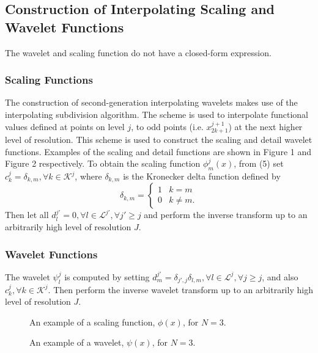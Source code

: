 \documentclass[11pt]{article}
\begin{document}
\subsection{Construction of Interpolating Scaling and Wavelet Functions}
The wavelet and scaling function do not have a closed-form expression.
\subsubsection{Scaling Functions}
The construction of second-generation interpolating wavelets makes use of the interpolating subdivision algorithm. 
The scheme is used to interpolate functional values defined at points on level $j$, to odd points (i.e. $x_{2k+1}^{j+1}$) 
at the next higher level of resolution. This scheme is used to construct the scaling and detail wavelet functions. 
Examples of the scaling and detail functions are shown in Figure 1 and Figure 2 respectively.
To obtain the scaling function $\phi_{m}^{j}(x)$, from (5) set $c_{k}^{j}=\delta_{k,m}, \forall k \in \mathcal{K}^j$, where $\delta_{k,m}$ is the Kronecker delta function defined by
\[ \delta_{k,m} = \begin{cases} 
      1 & k=m \\
      0 & k \neq m.
   \end{cases}
\]
Then let all $d_{l}^{j'}=0, \forall l \in \mathcal{L}^{j'}, \forall j' \geq j$ and perform the inverse transform up to an arbitrarily high level of resolution $J$. 

\subsubsection{Wavelet Functions}
The wavelet $\psi_{l}^{j}$ is computed by setting $d_{m}^{j'} = \delta_{j',j} \delta_{l,m}, \forall l \in \mathcal{L}^{j}, \forall j \geq j$, and also $c_{k}^{j}, \forall k \in \mathcal{K}^j$. Then perform the inverse wavelet transform up to an arbitrarily high level of resolution $J$.

\begin{figure}
	\center
	
	\caption{An example of a scaling function, $\phi(x)$, for $N=3$.}
\end{figure}
\begin{figure}
	\center
	
	\caption{An example of a wavelet, $\psi(x)$, for $N=3$.}
\end{figure}
\end{document}
